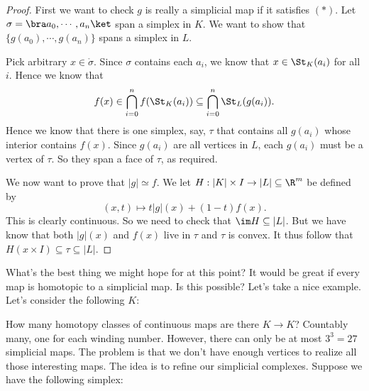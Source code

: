 \documentclass[a4paper]{article}
\begin{document}
\begin{proof}
  First we want to check $g$ is really a simplicial map if it satisfies $(*)$. Let $\sigma = \bra a_0,\cdots, a_n\ket$ span a simplex in $K$. We want to show that $\{g(a_0), \cdots, g(a_n)\}$ spans a simplex in $L$.

  Pick arbitrary $x \in \mathring{\sigma}$. Since $\sigma$ contains each $a_i$, we know that $x \in \St_K(a_i)$ for all $i$. Hence we know that
  \[
    f(x) \in \bigcap_{i = 0}^n f(\St_K(a_i)) \subseteq \bigcap_{i = 0}^n \St_L(g(a_i)).
  \]
  Hence we know that there is one simplex, say, $\tau$ that contains all $g(a_i)$ whose interior contains $f(x)$. Since $g(a_i)$ are all vertices in $L$, each $g(a_i)$ must be a vertex of $\tau$. So they span a face of $\tau$, as required.

  We now want to prove that $|g| \simeq f$. We let $H: |K| \times I \to |L| \subseteq \R^m$ be defined by
  \[
    (x, t) \mapsto t |g|(x) + (1 - t)f(x).
  \]
  This is clearly continuous. So we need to check that $\im H \subseteq |L|$. But we have know that both $|g|(x)$ and $f(x)$ live in $\tau$ and $\tau$ is convex. It thus follow that $H(x \times I) \subseteq \tau \subseteq |L|$.
\end{proof}
What's the best thing we might hope for at this point? It would be great if every map is homotopic to a simplicial map. Is this possible? Let's take a nice example. Let's consider the following $K$:
\begin{center}
\end{center}
How many homotopy classes of continuous maps are there $K \to K$? Countably many, one for each winding number. However, there can only be at most $3^3 = 27$ simplicial maps. The problem is that we don't have enough vertices to realize all those interesting maps. The idea is to refine our simplicial complexes. Suppose we have the following simplex:
\begin{center}
\end{center}
\end{document}
